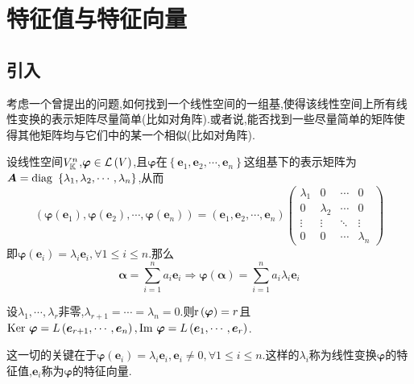 \section{特征值与特征向量}
\subsection{引入}
考虑一个曾提出的问题,如何找到一个线性空间的一组基,使得该线性空间上所有线性变换的表示矩阵尽量简单(比如对角阵).或者说,能否找到一些尽量简单的矩阵使得其他矩阵均与它们中的某一个相似(比如对角阵).

设线性空间$V_{\mathbb{K}}^n$,$\bm{\varphi}\in\mathcal{L}  \left(V\right)$,且$\bm{\varphi}$在$\left\{
    \bm{e}_1,\bm{e}_2,\cdots,\bm{e}_n
    \right\}$这组基下的表示矩阵为$\bm{A}=\operatorname{diag\,} \,\left\{
    \lambda_1,\lambda_2,\cdots,\lambda_n
    \right\}$,从而
\[
    \left(
    \bm{\varphi}\left(\bm{e}_1\right),\bm{\varphi}\left(\bm{e}_2\right),\cdots,\bm{\varphi}\left(\bm{e}_n\right)
    \right)=
    \left(
    \bm{e}_1,\bm{e}_2,\cdots,\bm{e}_n
    \right)\begin{pmatrix}
        \lambda_1 & 0         & \cdots & 0         \\
        0         & \lambda_2 & \cdots & 0         \\
        \vdots    & \vdots    & \ddots & \vdots    \\
        0         & 0         & \cdots & \lambda_n
    \end{pmatrix}
\]即$\bm{\varphi}\left(
    \bm{e}_i
    \right)=\lambda_i\bm{e}_i,\forall 1\leqslant i\leqslant n.$那么
\[
    \bm{\alpha}= \sum_{i=1}^{n} a_i\bm{e}_i\Longrightarrow
    \bm{\varphi}\left(
    \bm{\alpha}
    \right)=\sum_{i=1}^{n}a_i\lambda_i
    \bm{e}_i
\]

设$\lambda_1,\cdots,\lambda_r$非零,$
    \lambda_{r+1}=\cdots=\lambda_n=0.$则$\mathrm{r} \left(
    \bm{\varphi}
    \right)=r$且$\operatorname{Ker\,} \bm{\varphi}=L\left(
    \bm{e}_{r+1},\cdots,\bm{e}_n
    \right),\operatorname{Im\,} \bm{\varphi}=L\left(
    \bm{e}_1,\cdots,\bm{e}_r
    \right)$.

这一切的关键在于$
    \bm{\varphi}\left(
    \bm{e}_i
    \right)=\lambda_i\bm{e}_i,\bm{e}_i\neq 0,\forall 1\leqslant i\leqslant n
$.这样的$\lambda_i$称为线性变换$\bm{\varphi}$的特征值,$\bm{e}_i$称为$\bm{\varphi}$的特征向量.
